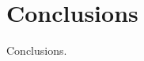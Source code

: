 \documentclass[Masterthesis.tex]{subfiles}
\begin{document}
\chapter{Conclusions}

Conclusions.
\end{document}
